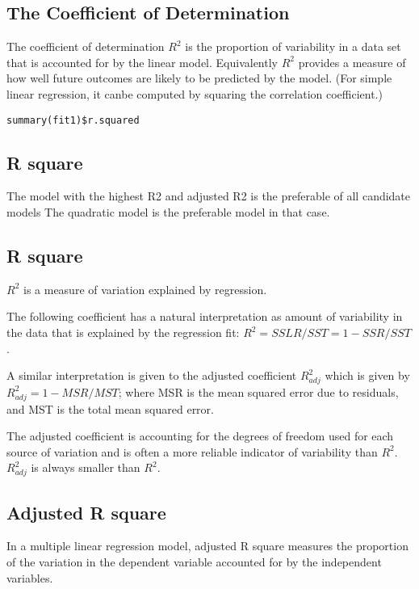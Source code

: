 \subsection{The Coefficient of Determination}
The coefficient of determination $R^2$ is the proportion of variability in a data set that is accounted for by the linear model.
Equivalently $R^2$ provides a measure of how well future outcomes are likely to be predicted by the model.
(For simple linear regression, it canbe computed by squaring the correlation coefficient.)
\begin{framed}
\begin{verbatim}
summary(fit1)$r.squared
\end{verbatim}
\end{framed}
\newpage

\subsection{R square}
The model with the highest R2 and adjusted R2  is the preferable of all candidate models
The quadratic model is the preferable model in that case.

\subsection{R square}
$R^2$ is a measure of variation explained by regression.

The following coefficient has a natural interpretation as amount
of variability in the data that is explained by the regression
fit: $R^2 = SSLR/SST = 1 - SSR/SST$.

A similar interpretation is given to the adjusted coefficient
$R^2_{adj}$ which is given by $R^2_{adj} = 1 - MSR/MST $; where
MSR is the mean squared error due to residuals, and MST is the
total mean squared error.

The adjusted coefficient is accounting for the degrees of freedom
used for each source of variation and is often a more reliable
indicator of variability than $R^2$. $R^2_{adj}$ is always smaller
than $R^2$.

\subsection{Adjusted R square}

In a multiple linear regression model, adjusted R square measures the proportion of the variation in the dependent variable accounted for by the independent variables.

